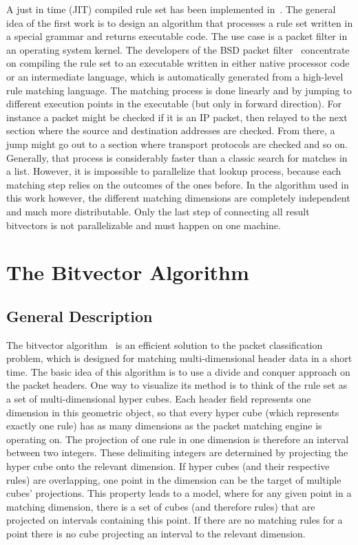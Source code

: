 \documentclass[a4paper,
		12pt,
		parskip=full,
		titlepage
		]{scrartcl}
\begin{document}
A just in time (JIT) compiled rule set has been implemented in~\cite{dpf}.
The general idea of the first work is to design an algorithm that processes a rule set
written in a special grammar and returns executable code.
The use case is a packet filter in an operating system kernel.
The developers of the BSD packet filter~\cite{bpf, bpfplus} concentrate on compiling the rule set to an executable written in 
either native processor code or an intermediate language, 
which is automatically generated from a high-level rule matching language.
The matching process is done linearly and by jumping to different execution points in the executable (but only in forward direction).
For instance a packet might be checked if it is an IP packet, then relayed 
to the next section where the source and destination addresses are checked.
From there, a jump might go out to a section where transport protocols are checked and so on.
Generally, that process is considerably faster than a classic search for matches in a list.
However, it is impossible to parallelize that lookup process, because each matching step relies on the outcomes of the ones before.
In the algorithm used in this work however, the different matching dimensions are 
completely independent and much more distributable.
Only the last step of connecting all result bitvectors is not parallelizable and 
must happen on one machine.

\section{The Bitvector Algorithm}
\subsection{General Description}
\label{sec:bv-general}
The bitvector algorithm~\cite{bv} is an efficient solution to the packet 
classification problem, which is designed for matching multi-dimensional header data in a short time.
The basic idea of this algorithm is to use a divide and conquer approach on the packet headers.
One way to visualize its method is to think of the rule set as a set of multi-dimensional hyper cubes.
Each header field represents one dimension in this geometric object, so 
that every hyper cube (which represents exactly one rule) has as many dimensions as the packet matching engine is operating on.
The projection of one rule in one dimension is therefore an interval between two integers.
These delimiting integers are determined by projecting the hyper cube onto the relevant dimension.
If hyper cubes (and their respective rules) are overlapping, one point in the dimension can be the target of multiple cubes' projections. 
This property leads to a model, where for any given point in a matching 
dimension, there is a set of cubes (and therefore rules) that are projected on intervals containing this point.
If there are no matching rules for a point there is no cube projecting an interval to the relevant dimension.
\end{document}
